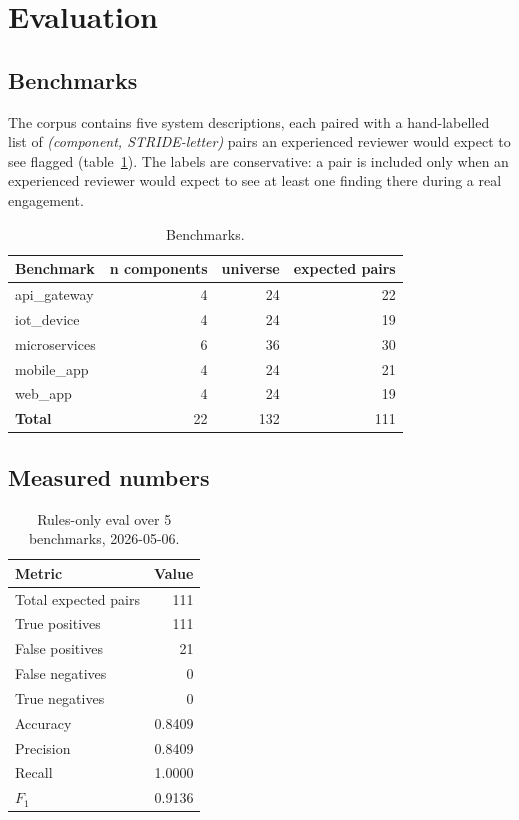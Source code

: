 \documentclass[conference]{IEEEtran}
\begin{document}
\section{Evaluation}

\subsection{Benchmarks}
The corpus contains five system descriptions, each paired with a
hand-labelled list of \emph{(component, STRIDE-letter)} pairs an
experienced reviewer would expect to see flagged
(table~\ref{tab:benchmarks}). The labels are conservative: a pair
is included only when an experienced reviewer would expect to see
at least one finding there during a real engagement.

\begin{table}[htbp]
\caption{Benchmarks.}
\label{tab:benchmarks}
\centering
\renewcommand{\arraystretch}{1.05}
\begin{tabular}{lrrr}
\toprule
\textbf{Benchmark} & \textbf{n components} & \textbf{universe} &
\textbf{expected pairs} \\
\midrule
api\_gateway   & 4 & 24 & 22 \\
iot\_device    & 4 & 24 & 19 \\
microservices  & 6 & 36 & 30 \\
mobile\_app    & 4 & 24 & 21 \\
web\_app       & 4 & 24 & 19 \\
\midrule
\textbf{Total} & 22 & 132 & 111 \\
\bottomrule
\end{tabular}
\end{table}

\subsection{Measured numbers}
\begin{table}[htbp]
\caption{Rules-only eval over 5 benchmarks, 2026-05-06.}
\label{tab:eval}
\centering
\renewcommand{\arraystretch}{1.1}
\begin{tabular}{lr}
\toprule
\textbf{Metric} & \textbf{Value} \\
\midrule
Total expected pairs   & 111 \\
True positives         & 111 \\
False positives        &  21 \\
False negatives        &   0 \\
True negatives         &   0 \\
Accuracy               & 0.8409 \\
Precision              & 0.8409 \\
Recall                 & 1.0000 \\
$F_1$                  & 0.9136 \\
\bottomrule
\end{tabular}
\end{table}
\end{document}
